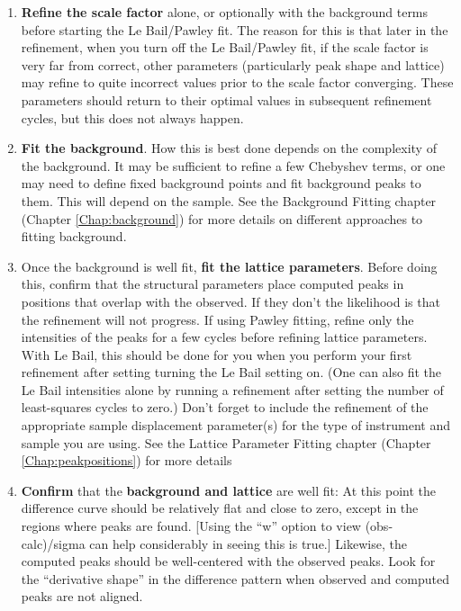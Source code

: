 \begin{enumerate}

 \item \textbf{Refine the scale factor} alone, or optionally with the background terms before starting the Le Bail/Pawley fit. The reason for this is that later in the refinement, when you turn off the Le Bail/Pawley fit, if the scale factor is very far from correct, other parameters (particularly peak shape and lattice) may refine to quite incorrect values prior to the scale factor converging. These parameters should return to their optimal values in subsequent refinement cycles, but this does not always happen.

 \item \textbf{Fit the background}. How this is best done depends on the complexity of the background. It may be sufficient to refine a few Chebyshev terms, or one may need to define fixed background points and fit background peaks to them. This will depend on the sample. See the Background Fitting chapter (Chapter \ref{Chap:background}) for more details on different approaches to fitting background. 

 \item Once the background is well fit, \textbf{fit the lattice parameters}. Before doing this, confirm that the structural parameters place computed peaks in positions that overlap with the observed. If they don’t the likelihood is that the refinement will not progress. If using Pawley fitting, refine only the intensities of the peaks for a few cycles before refining lattice parameters. With Le Bail, this should be done for you when you perform your first refinement after setting turning the Le Bail setting on. (One can also fit the Le Bail intensities alone by running a refinement after setting the number of least-squares cycles to zero.) Don’t forget to include the refinement of the appropriate sample displacement parameter(s) for the type of instrument and sample you are using. See the Lattice Parameter Fitting chapter (Chapter \ref{Chap:peakpositions}) for more details

 \item \textbf{Confirm} that the \textbf{background and lattice} are well fit: At this point the difference curve should be relatively flat and close to zero, except in the regions where peaks are found. [Using the “w” option to view (obs-calc)/sigma can help considerably in seeing this is true.] Likewise, the computed peaks should be well-centered with the observed peaks. Look for the “derivative shape” in the difference pattern when observed and computed peaks are not aligned. 


\end{enumerate}
